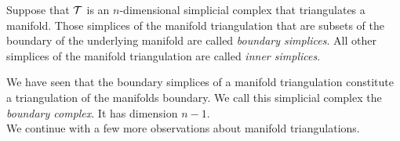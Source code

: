 \documentclass[12pt,a4paper]{article}
\begin{document}
Suppose that ${\mathcal T}$ is an $n$-dimensional simplicial complex that triangulates a manifold. 
Those simplices of the manifold triangulation that are subsets of the boundary of the underlying manifold are called \emph{boundary simplices}. 
All other simplices of the manifold triangulation are called \emph{inner simplices}. 

We have seen that the boundary simplices of a manifold triangulation constitute a triangulation of the manifolds boundary. 
We call this simplicial complex the \emph{boundary complex}. It has dimension $n-1$. 
\\

We continue with a few more observations about manifold triangulations.
\end{document}
